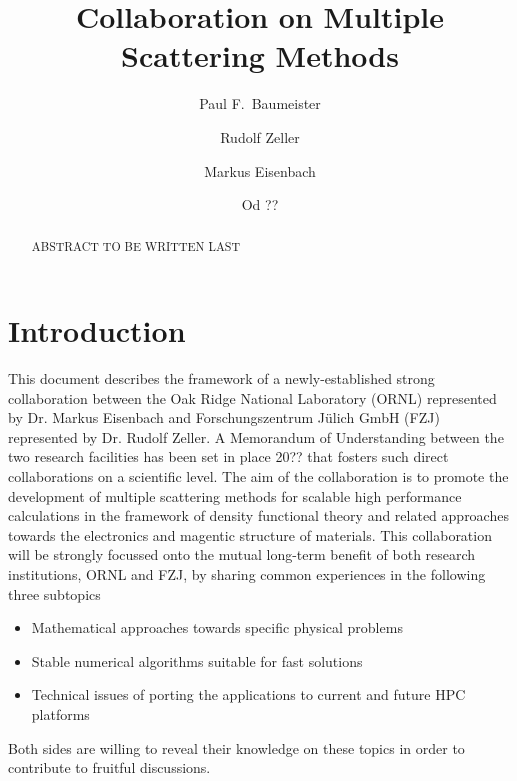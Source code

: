 \documentclass{llncs}
\begin{document}
\title{Collaboration on Multiple Scattering Methods}

\author{ 
  Paul F.~Baumeister 
  \and
  Rudolf Zeller
  \and
  Markus Eisenbach
  \and
  Od ??
}


\maketitle
\thispagestyle{firstpage}

\begin{abstract}
  ABSTRACT TO BE WRITTEN LAST
\end{abstract}

\section{Introduction} \label{section:intro}
This document describes the framework of a newly-established strong collaboration
between the Oak Ridge National Laboratory (ORNL) represented by Dr. Markus Eisenbach
and Forschungszentrum J\"ulich GmbH (FZJ) represented by Dr. Rudolf Zeller.
A Memorandum of Understanding between the two research facilities has been set in place 20?? 
that fosters such direct collaborations on a scientific level.
The aim of the collaboration is to promote the development of multiple scattering methods
for scalable high performance calculations in the framework of density functional theory
and related approaches towards the electronics and magentic structure of materials.
This collaboration will be strongly focussed onto the mutual long-term benefit of both research institutions, 
ORNL and FZJ, by sharing common experiences in the following three subtopics
\begin{itemize}
 \item Mathematical approaches towards specific physical problems  
 \item Stable numerical algorithms suitable for fast solutions
 \item Technical issues of porting the applications to current and future HPC platforms
\end{itemize}
Both sides are willing to reveal their knowledge on these topics in order to
contribute to fruitful discussions.
\end{document}
